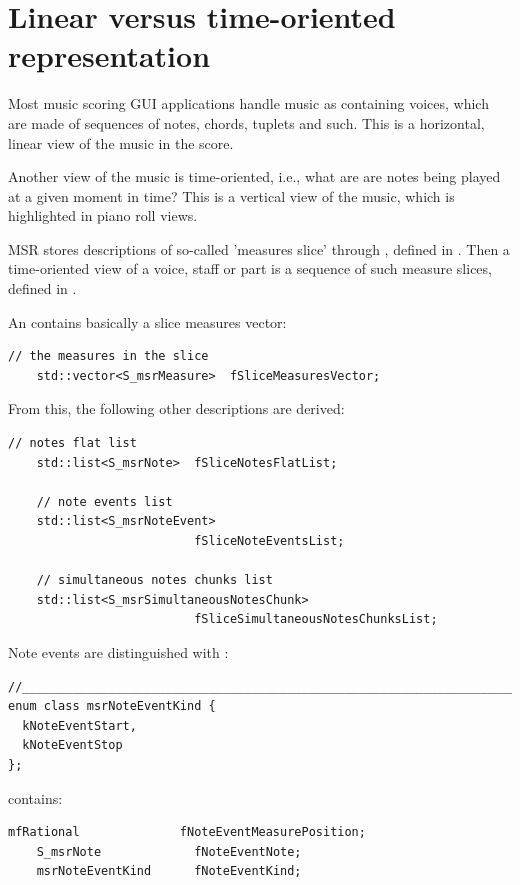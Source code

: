 \section{Linear versus time-oriented representation}\label{Linear versus time-oriented representation}

Most music scoring GUI applications handle music as containing voices, which are made of sequences of notes, chords, tuplets and such. This is a horizontal, linear view of the music in the score.

Another view of the music is time-oriented, i.e., what are are notes being played at a given moment in time? This is a vertical view of the music, which is highlighted in piano roll views.

MSR stores descriptions of so-called 'measures slice' through , defined in . Then a time-oriented view of a voice, staff or part is a sequence of such measure slices, defined in .%

An  contains basically a slice measures vector:
\begin{lstlisting}[language=CPlusPlus]
    // the measures in the slice
    std::vector<S_msrMeasure>  fSliceMeasuresVector;
\end{lstlisting}

From this, the following other descriptions are derived:
\begin{lstlisting}[language=CPlusPlus]
    // notes flat list
    std::list<S_msrNote>  fSliceNotesFlatList;

    // note events list
    std::list<S_msrNoteEvent>
                          fSliceNoteEventsList;

    // simultaneous notes chunks list
    std::list<S_msrSimultaneousNotesChunk>
                          fSliceSimultaneousNotesChunksList;
\end{lstlisting}

Note events are distinguished with :
\begin{lstlisting}[language=CPlusPlus]
//________________________________________________________________________
enum class msrNoteEventKind {
  kNoteEventStart,
  kNoteEventStop
};
\end{lstlisting}

 contains:
\begin{lstlisting}[language=CPlusPlus]
    mfRational              fNoteEventMeasurePosition;
    S_msrNote             fNoteEventNote;
    msrNoteEventKind      fNoteEventKind;

\end{lstlisting}

